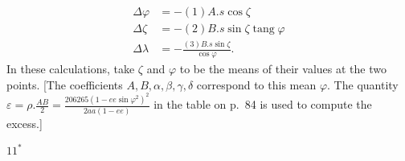 \[
\begin{aligned}
\Delta\varphi&=-(1)A.s\cos\zeta\\
\Delta\zeta&=-(2)B.s\sin\zeta\operatorname{tang}\varphi\\
\Delta\lambda&=-\frac{(3)B.s\sin\zeta}{\cos\varphi}.
\end{aligned}
\]
In these calculations, take \(\zeta\) and \(\varphi\) to be the means of their
values at the two points. [The coefficients
\(A,B,\alpha,\beta,\gamma,\delta\) correspond to this mean \(\varphi\). The quantity
\(\varepsilon=\rho.\frac{AB}{2}=\frac{206265(1-ee\sin\varphi^2)^2}{2aa(1-ee)}\)
in the table on p.~84 is used to compute the excess.]
\par\smallskip\noindent\hfill\(11^*\)\hspace{.12\textwidth}\par

